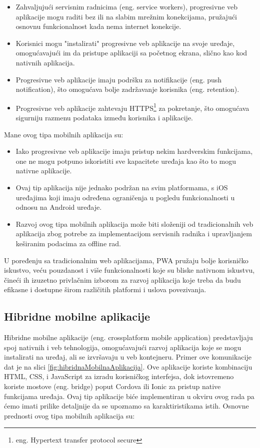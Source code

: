 \documentclass[12pt,oneside]{memoir}
\begin{document}
\begin{itemize}
    \item Zahvaljujući servisnim radnicima\cite{serviceWorkers} (eng. service workers), progresivne veb aplikacije mogu raditi bez ili na slabim mrežnim konekcijama, pružajući osnovnu funkcionalnost kada nema internet konekcije.
    \item Korisnici mogu "instalirati" progresivne veb aplikacije na svoje uređaje, omogućavajući im da pristupe aplikaciji sa početnog ekrana, slično kao kod nativnih aplikacija.
    \item Progresivne veb aplikacije imaju podršku za notifikacije (eng. push notification), što omogućava bolje zadržavanje korisnika (eng. retention).
    \item Progresivne veb aplikacije zahtevaju HTTPS\footnote{eng. Hypertext transfer protocol secure} za pokretanje, što omogućava sigurniju razmenu podataka između korisnika i aplikacije.
\end{itemize}
Mane ovog tipa mobilnih aplikacija su:
\begin{itemize}
    \item Iako progresivne veb aplikacije imaju pristup nekim hardverskim funkcijama, one ne mogu potpuno iskoristiti sve kapacitete uređaja kao što to mogu nativne aplikacije.
    \item Ovaj tip aplikacija nije jednako podržan na svim platformama, s iOS uređajima koji imaju određena ograničenja u pogledu funkcionalnosti u odnosu na Android uređaje.
    \item Razvoj ovog tipa mobilnih aplikacija može biti složeniji od tradicionalnih veb aplikacija zbog potrebe za implementacijom servisnih radnika i upravljanjem keširanim podacima za offline rad.
\end{itemize}

U poređenju sa tradicionalnim web aplikacijama, PWA pružaju bolje korisničko iskustvo, veću pouzdanost i više funkcionalnosti koje su bliske nativnom iskustvu, čineći ih izuzetno privlačnim izborom za razvoj aplikacija koje treba da budu efikasne i dostupne širom različitih platformi i uslova povezivanja.

\subsection{Hibridne mobilne aplikacije}

Hibridne mobilne aplikacije\cite{crossPlatformApps} (eng. crossplatform mobile application) predstavljaju spoj nativnih i veb tehnologija, omogućavajući razvoj aplikacija koje se mogu instalirati na uređaj, ali se izvršavaju u veb kontejneru. Primer ove komunikacije dat je na slici \ref{fig:hibridnaMobilnaAplikacija}. Ove aplikacije koriste kombinaciju HTML, CSS, i JavaScript za izradu korisničkog interfejsa, dok istovremeno koriste mostove (eng. bridge) poput Cordova ili Ionic\cite{ionicCordova} za pristup native funkcijama uređaja. Ovaj tip aplikacije biće implementiran u okviru ovog rada pa ćemo imati prilike detaljnije da se upoznamo sa karaktiristikama istih. Osnovne prednosti ovog tipa mobilnih aplikacija su:
\end{document}
